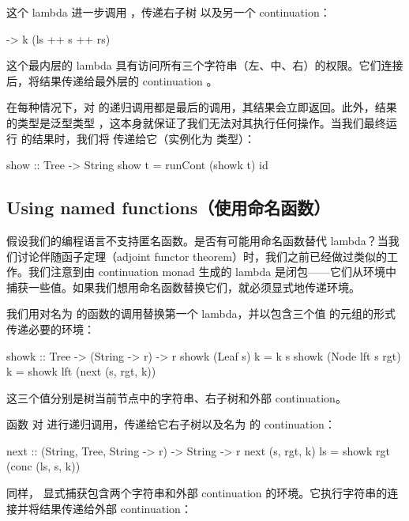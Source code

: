 \documentclass[DaoFP]{subfiles}
\begin{document}
    这个 lambda 进一步调用 ，传递右子树  以及另一个 continuation：

    \begin{haskell}
        \rs -> k (ls ++ s ++ rs)
    \end{haskell}

    这个最内层的 lambda 具有访问所有三个字符串（左、中、右）的权限。它们连接后，将结果传递给最外层的 continuation 。

    在每种情况下，对  的递归调用都是最后的调用，其结果会立即返回。此外，结果的类型是泛型类型 ，这本身就保证了我们无法对其执行任何操作。当我们最终运行  的结果时，我们将  传递给它（实例化为  类型）：

    \begin{haskell}
        show :: Tree -> String
        show t = runCont (showk t) id
    \end{haskell}

    \subsection{Using named functions（使用命名函数）}

    假设我们的编程语言不支持匿名函数。是否有可能用命名函数替代 lambda？当我们讨论伴随函子定理（adjoint functor theorem）时，我们之前已经做过类似的工作。我们注意到由 continuation monad 生成的 lambda 是闭包——它们从环境中捕获一些值。如果我们想用命名函数替换它们，就必须显式地传递环境。

    我们用对名为  的函数的调用替换第一个 lambda，并以包含三个值  的元组的形式传递必要的环境：

    \begin{haskell}
        showk :: Tree -> (String -> r) -> r
        showk (Leaf s) k = k s
        showk (Node lft s rgt) k =
        showk lft (next (s, rgt, k))
    \end{haskell}

    这三个值分别是树当前节点中的字符串、右子树和外部 continuation。

    函数  对  进行递归调用，传递给它右子树以及名为  的 continuation：

    \begin{haskell}
        next :: (String, Tree, String -> r) -> String -> r
        next (s, rgt, k) ls = showk rgt (conc (ls, s, k))
    \end{haskell}

    同样， 显式捕获包含两个字符串和外部 continuation 的环境。它执行字符串的连接并将结果传递给外部 continuation：
\end{document}

